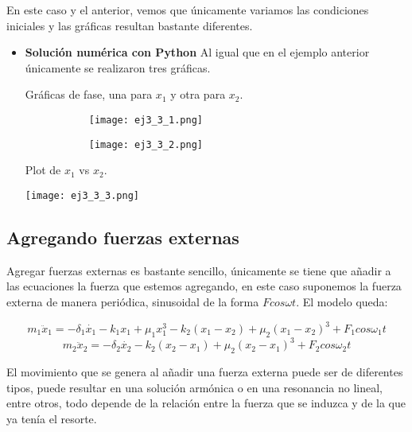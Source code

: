 \documentclass[12pt]{article}
\begin{document}
\begin{itemize}
En este caso y el anterior, vemos que únicamente variamos las condiciones iniciales y las gráficas resultan bastante diferentes.

\begin{itemize}
\item \textbf{Solución numérica con Python}
Al igual que en el ejemplo anterior únicamente se realizaron tres gráficas.

\clearpage
Gráficas de fase, una para $x_1$ y otra para $x_2$.

\begin{figure}[h!]
\begin{subfigure}{.55\textwidth}
\centering
\texttt{[image: ej3\_3\_1.png]}
\end{subfigure}
\begin{subfigure}{.55\textwidth}
\centering
\texttt{[image: ej3\_3\_2.png]}
\end{subfigure}
\end{figure}


Plot de $x_1$ vs $x_2$.

\begin{center}
        \texttt{[image: ej3\_3\_3.png]}
\end{center}


\end{itemize}
\end{itemize}

\subsection{Agregando fuerzas externas}

Agregar fuerzas externas es bastante sencillo, únicamente se tiene que añadir a las ecuaciones la fuerza que estemos agregando, en este caso suponemos la fuerza externa de manera periódica, sinusoidal de la forma $F cos \omega t$. El modelo queda:


\begin{equation}
m_1 \ddot x_1 = -\delta _1 \dot{x_1} -k_1x_1 +\mu _1 x_1 ^3- k_2(x_1-x_2) + \mu _2 (x_1-x_2)^3 + F_1 cos \omega _1 t
\end{equation}
\begin{equation}
m_2 \ddot x_2 = -\delta _2 \dot{x_2} -k_2(x_2-x_1) +\mu _2 (x_2-x_1)^3 + F_2 cos \omega _2 t
\end{equation} 

El movimiento que se genera al añadir una fuerza externa puede ser de diferentes tipos, puede resultar en una solución armónica o en una resonancia no lineal, entre otros, todo depende de la relación entre la fuerza que se induzca y de la que ya tenía el resorte. 
\end{document}
